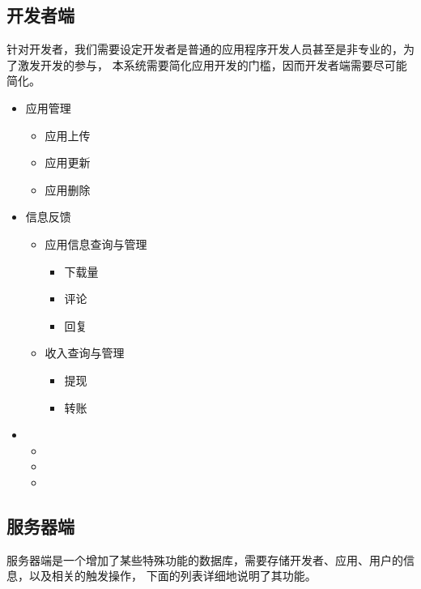 \subsection{开发者端}
针对开发者，我们需要设定开发者是普通的应用程序开发人员甚至是非专业的，为了激发开发的参与，
本系统需要简化应用开发的门槛，因而开发者端需要尽可能简化。
\begin{itemize}
\item 应用管理

	\begin{itemize}
	\item 应⽤上传
	\item 应用更新
	\item 应用删除
	\end{itemize}
\item 信息反馈
	\begin{itemize}
	\item
	应⽤信息查询与管理
	\begin{itemize}
		\item 下载量
		\item 评论
		\item 回复
	\end{itemize}
	\item 收⼊查询与管理
	\begin{itemize}
		\item 提现
		\item 转账
	\end{itemize}
	\end{itemize}

\item \color{red}{应用开发}
	\begin{itemize}
		\item \color{red}{代码编辑}
		\item \color{red}{代码编译与运行}
		\item \color{red}{debug功能}
	\end{itemize}
\end{itemize}
	

\subsection{服务器端}
服务器端是一个增加了某些特殊功能的数据库，需要存储开发者、应用、用户的信息，以及相关的触发操作，
下面的列表详细地说明了其功能。

